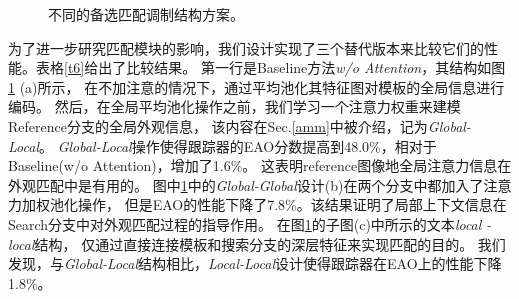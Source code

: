 \documentclass[promaster]{thesis-uestc}
\begin{document}
\begin{figure}[htp!]
    \begin{center}
     \quad
     \quad
    \end{center}
       \caption{不同的备选匹配调制结构方案。}
    \label{structure}
\end{figure}
    
    


为了进一步研究匹配模块的影响，我们设计实现了三个替代版本来比较它们的性能。表格\ref{t6}给出了比较结果。
第一行是Baseline方法\textit{w/o Attention}，其结构如图 \ref{structure} (a)所示，
在不加注意的情况下，通过平均池化其特征图对模板的全局信息进行编码。
然后，在全局平均池化操作之前，我们学习一个注意力权重来建模Reference分支的全局外观信息，
该内容在Sec.\ref{amm}中被介绍，记为\textit{Global-Local}。
\textit{Global-Local}操作使得跟踪器的EAO分数提高到48.0\%，相对于Baseline(w/o Attention)，增加了1.6\%。
这表明reference图像地全局注意力信息在外观匹配中是有用的。
图中\ref{structure}中的\textit{Global-Global}设计(b)在两个分支中都加入了注意力加权池化操作，
但是EAO的性能下降了7.8\%。该结果证明了局部上下文信息在Search分支中对外观匹配过程的指导作用。
在图\ref{structure}的子图(c)中所示的文本\textit{local - local}结构，
仅通过直接连接模板和搜索分支的深层特征来实现匹配的目的。
我们发现，与\textit{Global-Local}结构相比，\textit{Local-Local}设计使得跟踪器在EAO上的性能下降1.8\%。

\begin{table}[htp!]
    \caption{VOT2018数据集上备选匹配调制结构的性能比较。}
    \begin{center}
    \end{center}
    
    \label{t6}
\end{table}
\end{document}
